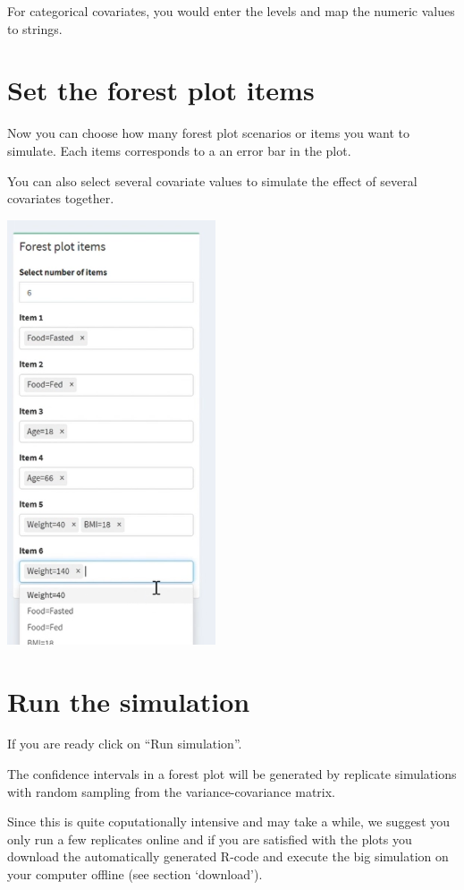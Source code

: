 \documentclass[
]{book}
\begin{document}
For categorical covariates, you would enter the levels and map the numeric values to strings.

\section{Set the forest plot items}\label{set-the-forest-plot-items}

Now you can choose how many forest plot scenarios or items you want to simulate. Each items corresponds to a an error bar in the plot.

You can also select several covariate values to simulate the effect of several covariates together.

\includegraphics[width=2.42708in,height=\textheight]{pictures/forest_plot_items.png}

\section{Run the simulation}\label{run-the-simulation}

If you are ready click on ``Run simulation''.

The confidence intervals in a forest plot will be generated by replicate simulations with random sampling from the variance-covariance matrix.

Since this is quite coputationally intensive and may take a while, we suggest you only run a few replicates online and if you are satisfied with the plots you download the automatically generated R-code and execute the big simulation on your computer offline (see section `download').
\end{document}
